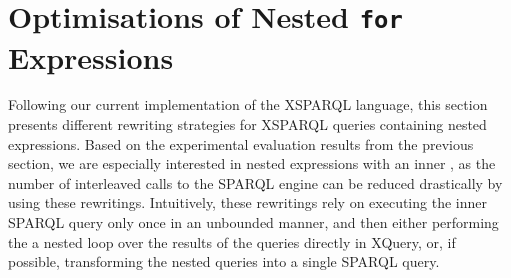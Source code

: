 \section{Optimisations of Nested \texttt{for} Expressions}
\label{sec:optimisation}

Following our current implementation of the XSPARQL language, this section presents different rewriting strategies for
XSPARQL queries containing nested expressions.  
%
Based on the experimental evaluation results from the previous section, we are especially interested in nested
expressions with an inner \SparqlForClause, as the number of interleaved calls to the SPARQL engine can be reduced
drastically by using these rewritings.
%
Intuitively, these rewritings rely on executing the inner SPARQL query only once in an unbounded manner, and then either
performing the a nested loop over the results of the queries directly in XQuery, or, if possible, transforming the
nested queries into a single SPARQL query.

